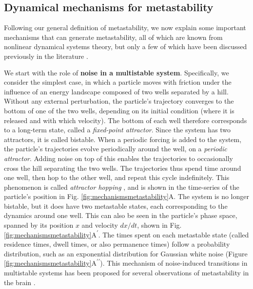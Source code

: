 \documentclass[reprint,superscriptaddress,showpacs,amsmath,amssymb,aps,floatfix,nolongbibliography]{revtex4-2}
\theoremstyle{definition}
\newcommand{\Emph}[1]{\textbf{#1}}
\newcommand*{\supprime}{\textsuperscript{\everymodeprime}\xspace}
\newcommand*{\everymodeprime}{\ensuremath{\prime}}
\begin{document}
\subsection{Dynamical mechanisms for metastability}
\label{sec:mechanisms}
Following our general definition of metastability, we now explain some important mechanisms that can generate metastability, all of which are known from nonlinear dynamical systems theory, but only a few of which have been discussed previously in the literature \cite{graben2019metastable, cavanna2018dynamic}. 

We start with the role of \Emph{noise in a multistable system}. Specifically, we consider the simplest case, in which a particle moves with friction under the influence of an energy landscape composed of two wells separated by a hill. Without any external perturbation, the particle's trajectory converges to the bottom of one of the two wells, depending on its initial condition (where it is released and with which velocity). The bottom of each well therefore corresponds to a long-term state, called a \textit{fixed-point attractor}. Since the system has two attractors, it is called bistable. 
When a periodic forcing is added to the system, the particle's trajectories evolve periodically around the well, on a \textit{periodic attractor}. Adding noise on top of this enables the trajectories to occasionally cross the hill separating the two wells. The trajectories thus spend time around one well, then hop to the other well, and repeat this cycle indefinitely. This phenomenon is called \textit{attractor hopping} \cite{kraut2002multistability}, and is shown in the time-series of the particle's position in Fig. \ref{fig:mechanismsmetastability}A. The system is no longer bistable, but it does have two metastable states, each corresponding to the dynamics around one well. This can also be seen in the particle's phase space, spanned by its position $x$ and velocity $dx/dt$, shown in Fig. \ref{fig:mechanismsmetastability}A\supprime. The times spent on each metastable state (called residence times, dwell times, or also permanence times) follow a probability distribution, such as an exponential distribution for Gaussian white noise \cite{hanggi1986escape} (Figure \ref{fig:mechanismsmetastability}A\textsuperscript{\everymodeprime\everymodeprime}). This mechanism of noise-induced transitions in multistable systems has been proposed for several observations of metastability in the brain \cite{brinkman2022metastable, hudson2017metastability}.
\end{document}
